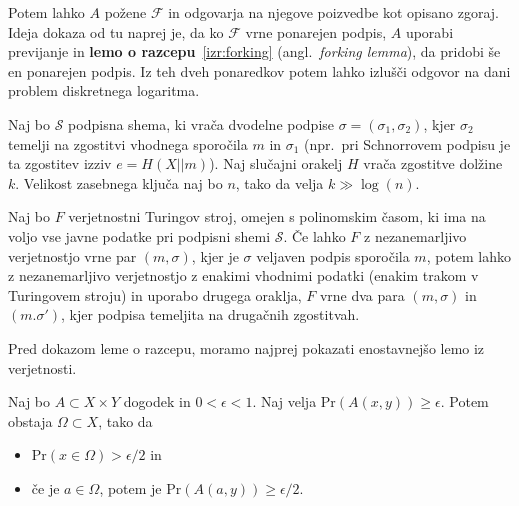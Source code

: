 \documentclass[isrm2, tisk]{fmfdelo}
\begin{document}
Potem lahko $A$ požene $\mathcal{F}$ in odgovarja na njegove poizvedbe kot opisano zgoraj. Ideja
dokaza od tu naprej je, da ko $\mathcal{F}$ vrne ponarejen podpis, $A$ uporabi previjanje in
\textbf{lemo o razcepu}~\ref{izr:forking} (angl.\ \textit{forking lemma}), da pridobi še en ponarejen 
podpis. Iz teh dveh ponaredkov potem lahko izlušči odgovor na dani problem diskretnega logaritma.

\begin{izrek}
\label{izr:forking}
    Naj bo $\mathcal{S}$ podpisna shema, ki vrača dvodelne podpise $\sigma = (\sigma_1, \sigma_2)$,
    kjer $\sigma_2$ temelji na zgostitvi vhodnega sporočila $m$ in $\sigma_1$ (npr.\ pri Schnorrovem 
    podpisu je ta zgostitev izziv  $e = H(X || m)$). Naj slučajni orakelj $H$ vrača zgostitve
    dolžine $k$. Velikost zasebnega ključa naj bo $n$, tako da velja $k \gg \log(n)$.

    Naj bo $F$ verjetnostni Turingov stroj, omejen s polinomskim časom, ki ima na voljo vse javne
    podatke pri podpisni shemi $\mathcal{S}$. Če lahko $F$ z nezanemarljivo verjetnostjo vrne par 
    $(m, \sigma)$, kjer je $\sigma$  veljaven podpis sporočila $m$, potem lahko z nezanemarljivo 
    verjetnostjo z enakimi vhodnimi podatki (enakim trakom v Turingovem stroju) in uporabo drugega 
    oraklja, $F$ vrne dva para  $(m, \sigma)$ in $(m. \sigma')$, kjer podpisa temeljita na 
    drugačnih zgostitvah.
\end{izrek}

Pred dokazom leme o razcepu, moramo najprej pokazati enostavnejšo lemo iz verjetnosti.

\begin{lema}
\label{lema:verjetnost}
    Naj bo $A \subset X \times Y$ dogodek in $0 < \epsilon < 1$. Naj velja $\text{Pr}(A(x, y)) \geq \epsilon$. 
    Potem obstaja $\Omega \subset X$, tako da \begin{itemize}
        \item $\text{Pr}(x \in \Omega) > \epsilon / 2$ in
        \item če je $a \in \Omega$, potem je $\text{Pr}(A(a, y)) \geq \epsilon / 2$.
    \end{itemize}
\end{lema}
\end{document}
